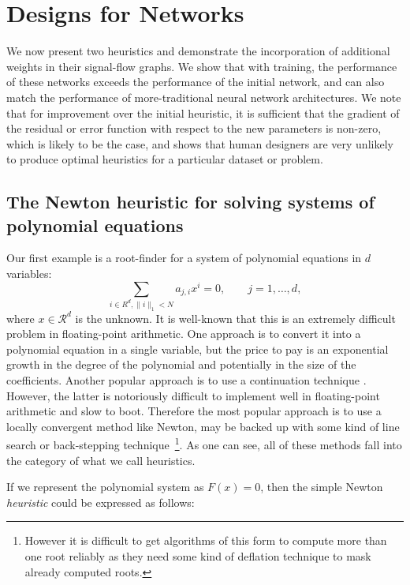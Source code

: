 \documentclass{article}
\begin{document}
\section{Designs for Networks} %
We now present two heuristics and demonstrate the incorporation of additional weights in their signal-flow graphs. We show that with training, the performance of these networks exceeds the performance of the initial network, and can also match the performance of more-traditional neural network architectures. We note that for improvement over the initial heuristic, it is sufficient that the gradient of the residual or error function with respect to the new parameters is non-zero, which is likely to be the case, and shows that human designers are very unlikely to produce optimal heuristics for a particular dataset or problem.

\subsection*{The Newton heuristic for solving systems of polynomial equations}

Our first example is a root-finder for a system of polynomial equations in $d$ variables:
\[
    \sum_{i \in R^d, \|i\|_1 < N} a_{j,i} x^i = 0, \qquad j = 1, \ldots, d,
\]
where $x\in\mathcal{R}^d$ is the unknown. It is well-known that this is an extremely difficult problem in floating-point arithmetic. One approach is to convert it into a polynomial equation in a single variable, but the price to pay is an exponential growth in the degree of the polynomial and potentially in the size of the coefficients. Another popular approach is to use a continuation technique \cite{allgower2012numerical}. However, the latter is notoriously difficult to implement well in floating-point arithmetic and slow to boot. Therefore the most popular approach is to use a locally convergent method like Newton, may be backed up with some kind of line search or back-stepping technique~\footnote{However it is difficult to get algorithms of this form to compute more than one root reliably as they need some kind of deflation technique to mask already computed roots.}. As one can see, all of these methods fall into the category of what we call heuristics.

If we represent the polynomial system as $F(x)=0$, then the simple Newton \textit{heuristic} could be expressed as follows:
\end{document}
